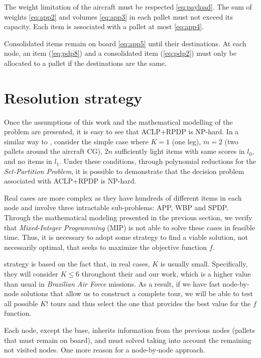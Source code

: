 \documentclass[preprint,authoryear]{elsarticle}
\begin{document}
The weight limitation of the aircraft must be respected \ref{eq:payload}. The sum of weights \ref{eq:app2} and volumes \ref{eq:app3} in each pallet must not exceed its capacity. Each item is associated with a pallet at most \ref{eq:app4}.

Consolidated items remain on board \ref{eq:app5} until their destinations. At each node, an item (\ref{eq:pdp8}) and a consolidated item (\ref{eq:pdp2}) must only be allocated to a pallet if the destinations are the same.


\section{Resolution strategy}
\label{sec5}

Once the assumptions of this work and the mathematical modelling of the problem are presented, it is easy to see that ACLP+RPDP is NP-hard. In a similar way to \cite[p. 6]{LurkinSchyns2015}, consider the simple case where $K=1$\/ (one leg), $m=2$ (two pallets around the aircraft CG), $2n$\/ sufficiently light items with same scores in $l_0$, and no items in $l_1$. Under these conditions, through polynomial reductions for the {\it Set-Partition Problem}, it is possible to demonstrate that the decision problem associated with ACLP+RPDP is NP-hard.

Real cases are more complex as they have hundreds of different items in each node and involve three intractable sub-problems: APP, WBP and SPDP. Through the mathematical modeling presented in the previous section, we verify that {\it Mixed-Integer Programming}\/ (MIP) is not able to solve these cases in feasible time. Thus, it is necessary to adopt some strategy to find a viable solution, not necessarily optimal, that seeks to maximize the objective function $f$.

\cite{MesquitaSanches2023} strategy is based on the fact that, in real cases, $K$\/ is usually small. Specifically, they will consider $K \leq 6$\/ throughout their and our work, which is a higher value than usual in {\it Brazilian Air Force} missions. As a result, if we have fast node-by-node solutions that allow us to construct a complete tour, we will be able to test all possible $K!$\/ tours and thus select the one that provides the best value for the $f$\/ function.

{\color{blue} Each node, except the base, inherits information from the previous nodes (pallets that must remain on board), and must solved taking into account the remaining not visited nodes. One more reason for a node-by-node approach.}
\end{document}
